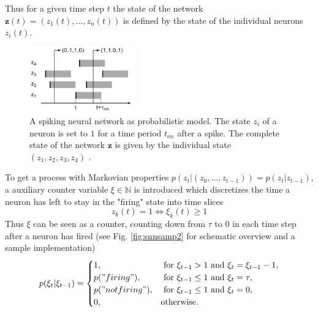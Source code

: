 Thus for a given time step $t$ the state of the network $\textbf{z}(t) = (z_1(t), ... ,z_n(t))$ is defined by the state of the individual neurons $z_i(t)$. 


\begin{figure}
	\centering
    	\includegraphics[width=0.4\textwidth]{imgs/snn_sample1.png} 
    \caption[A spiking neural network as probabilistic model.]{A spiking neural network as probabilistic model. The state $z_i$ of a neuron is set to $1$ for a time period $t_{on}$ after a spike. The complete state of the network $\textbf{z}$ is given by the individual state $(z_1, z_2, z_3, z_4)$  \cite{Petrovici2016}.}
	\label{fig:snnsamp1}
\end{figure}

To get a process with Markovian properties $p(z_t| (z_0, ..., z_{t-1})) = p(z_t| z_{t-1}) $, a auxiliary counter variable $\xi \in \mathbb{N}$ is introduced which discretizes the time a neuron has left to stay in the "firing" state into time slices
\[
z_k(t) = 1 \iff \xi_k(t) \ge 1
\]
Thus $\xi$ can be seen as a counter, counting down from $\tau$ to $0$ in each time step after a neuron has fired (see Fig. \ref{fig:snnsamp2} for schematic overview and a sample implementation)
\[
p(\xi_t | \xi_{t-1}) = 
\begin{cases}
	1, & \text{ for } \xi_{t-1} > 1 \text{ and } \xi_t = \xi_{t-1} -1 ,\\
	p("firing"), & \text{ for } \xi_{t-1} \le 1 \text{ and } \xi_t = \tau ,\\
	p("not firing"), & \text{ for } \xi_{t-1} \le 1 \text{ and } \xi_t = 0 ,\\
	0, & \text{otherwise}.
\end{cases}
\]

